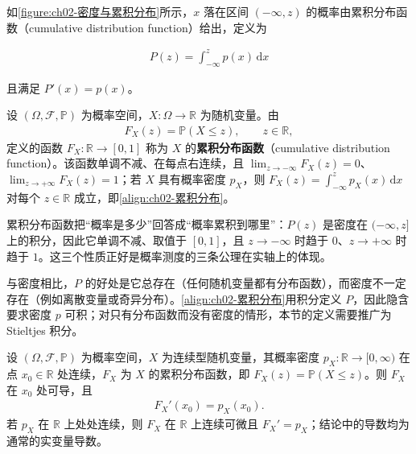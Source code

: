 \documentclass[../../main.tex]{subfiles}
\begin{document}
如\cref{figure:ch02-密度与累积分布}所示，$x$ 落在区间 $(-\infty,z)$ 的概率由累积分布函数（cumulative distribution function）给出，定义为

\begin{align}
  P(z) = \int_{-\infty}^{z} p(x)\,\mathrm{d}x
  \label{align:ch02-累积分布}
\end{align}

且满足 $P'(x)=p(x)$。

\begin{definition}[累积分布函数]\label{definition:ch02-累积分布函数}
设 $(\Omega,\mathcal{F},\mathbb{P})$ 为概率空间，$X:\Omega\to\mathbb{R}$ 为随机变量。由
\begin{align*}
  F_X(z)=\mathbb{P}(X\leqslant z),\qquad z\in\mathbb{R},
\end{align*}
定义的函数 $F_X:\mathbb{R}\to[0,1]$ 称为 $X$ 的\textbf{累积分布函数}（cumulative distribution function）。该函数单调不减、在每点右连续，且 $\lim_{z\to-\infty}F_X(z)=0$、$\lim_{z\to+\infty}F_X(z)=1$；若 $X$ 具有概率密度 $p_X$，则 $F_X(z)=\int_{-\infty}^{z}p_X(x)\,\mathrm{d}x$ 对每个 $z\in\mathbb{R}$ 成立，即\eqref{align:ch02-累积分布}。
\end{definition}

\begin{remark}
累积分布函数把“概率是多少”回答成“概率累积到哪里”：$P(z)$ 是密度在 $(-\infty,z]$ 上的积分，因此它单调不减、取值于 $[0,1]$，且 $z\to-\infty$ 时趋于 $0$、$z\to+\infty$ 时趋于 $1$。这三个性质正好是概率测度的三条公理在实轴上的体现。

与密度相比，$P$ 的好处是它总存在（任何随机变量都有分布函数），而密度不一定存在（例如离散变量或奇异分布）。\eqref{align:ch02-累积分布}用积分定义 $P$，因此隐含要求密度 $p$ 可积；对只有分布函数而没有密度的情形，本节的定义需要推广为 Stieltjes 积分。
\end{remark}

\begin{proposition}[累积分布函数的导数]\label{proposition:ch02-累积分布导数}
设 $(\Omega,\mathcal{F},\mathbb{P})$ 为概率空间，$X$ 为连续型随机变量，其概率密度 $p_X:\mathbb{R}\to[0,\infty)$ 在点 $x_0\in\mathbb{R}$ 处连续，$F_X$ 为 $X$ 的累积分布函数，即 $F_X(z)=\mathbb{P}(X\leqslant z)$。则 $F_X$ 在 $x_0$ 处可导，且
\begin{align*}
  F_X'(x_0)=p_X(x_0).
\end{align*}
若 $p_X$ 在 $\mathbb{R}$ 上处处连续，则 $F_X$ 在 $\mathbb{R}$ 上连续可微且 $F_X'=p_X$；结论中的导数均为通常的实变量导数。
\end{proposition}
\end{document}
